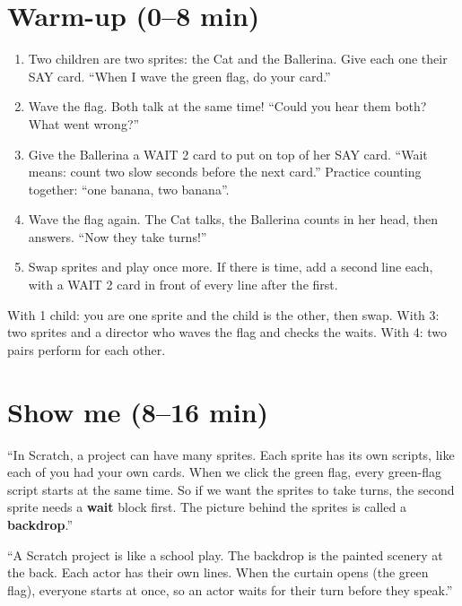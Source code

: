 \section{Warm-up (0--8 min)}
\begin{unplugged}
\begin{enumerate}[leftmargin=1.4em,itemsep=1pt]
  \item Two children are two sprites: the Cat and the Ballerina. Give each one their SAY card. \enquote{When I wave the green flag, do your card.}
  \item Wave the flag. Both talk at the same time! \enquote{Could you hear them both? What went wrong?}
  \item Give the Ballerina a WAIT 2 card to put on top of her SAY card. \enquote{Wait means: count two slow seconds before the next card.} Practice counting together: \enquote{one banana, two banana}.
  \item Wave the flag again. The Cat talks, the Ballerina counts in her head, then answers. \enquote{Now they take turns!}
  \item Swap sprites and play once more. If there is time, add a second line each, with a WAIT 2 card in front of every line after the first.
\end{enumerate}
With 1 child: you are one sprite and the child is the other, then swap. With 3: two sprites and a director who waves the flag and checks the waits. With 4: two pairs perform for each other.
\end{unplugged}

\section{Show me (8--16 min)}
\begin{teacherscript}
\enquote{In Scratch, a project can have many sprites. Each sprite has its own scripts, like each of you had your own cards. When we click the green flag, every green-flag script starts at the same time. So if we want the sprites to take turns, the second sprite needs a \textbf{wait} block first. The picture behind the sprites is called a \textbf{backdrop}.}
\end{teacherscript}

\begin{analogy}
\enquote{A Scratch project is like a school play. The backdrop is the painted scenery at the back. Each actor has their own lines. When the curtain opens (the green flag), everyone starts at once, so an actor waits for their turn before they speak.}
\end{analogy}

